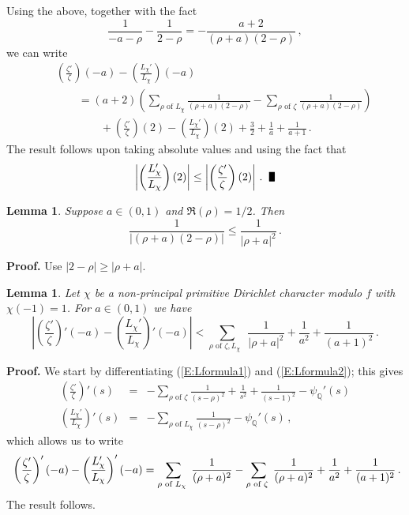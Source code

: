 \documentclass{amsart}
\newtheorem{lemma}[theorem]{Lemma}
\numberwithin{equation}{section}
\numberwithin{table}{section}
\begin{document}
Using the above, together with the fact
$$
 \frac{1}{-a-\rho}-\frac{1}{2-\rho}
 =
 -
 \frac{a+2}{(\rho+a)(2-\rho)}
 \,,
$$
we can write
\begin{eqnarray*}
  &&
  \left(\frac{\zeta'}{\zeta}\right)(-a)
  -
  \left(\frac{L_{\chi}'}{L_{\chi}}\right)(-a)
  \\[.5ex]
  &&
  \qquad
  =
  (a+2)
  \left(
  \sum_{\rho\text{ of $L_\chi$}}
   \frac{1}{(\rho+a)(2-\rho)}
  -
  \sum_{\rho\text{ of $\zeta$}}
   \frac{1}{(\rho+a)(2-\rho)}
   \right)
  \\[.5ex]
  &&
  \qquad
  \qquad
  +
  \left(\frac{\zeta'}{\zeta}\right)(2)
  -
  \left(\frac{L_\chi'}{L_\chi}\right)(2)
    +
  \frac{3}{2}+\frac{1}{a}+\frac{1}{a+1}
  \,.
\end{eqnarray*}
The result follows upon taking absolute values and using the fact that
$$
  \left|
  \left(
  \frac{L'_\chi}{L_\chi}  
  \right)
  (2)
  \right|
  \leq
    \left|
  \left(
  \frac{\zeta'}{\zeta}  
  \right)
  (2)
  \right|
  \,.
  \;\;
  \text{\raisebox{-.25ex}{\scalebox{.786}[1.272]{$\blacksquare$}}}
$$

\begin{lemma}\label{L:q2lemma3}
Suppose $a\in(0,1)$ and $\Re(\rho)=1/2$.
Then
$$
  \frac{1}{|(\rho+a)(2-\rho)|}
  \leq
  \frac{1}{|\rho+a|^2}
  \,.
$$
\end{lemma}

\noindent\textbf{Proof.}
Use $|2-\rho|\geq|\rho+a|$.
{\raisebox{-.25ex}{\scalebox{.786}[1.272]{$\blacksquare$}}}

\begin{lemma}\label{L:q2lemma4}
Let $\chi$ be a non-principal primitive Dirichlet character modulo $f$ with \mbox{$\chi(-1)=1$}.
For $a\in(0,1)$ we have
$$
 \left|
  \left(\frac{\zeta'}{\zeta}\right)'(-a)
  -
 \left(
 \frac{L_{\chi}'}{L_{\chi}}
 \right)'
 (-a)
 \right|
 <
 
 \sum_{\rho\text{ of $\zeta,L_\chi$ }}
 \frac{1}{|\rho+a|^2}
 +
 \frac{1}{a^2}
 +
 \frac{1}{(a+1)^2}
 \,.
$$
\end{lemma}

\noindent\textbf{Proof.}
We start by differentiating (\ref{E:Lformula1}) and (\ref{E:Lformula2}); this gives
\begin{eqnarray}
  \label{E:L1formula1}
  \left(\frac{\zeta'}{\zeta}\right)'(s)
  &=&
  -\sum_{\rho\text{ of $\zeta$}}
  \frac{1}{(s-\rho)^2}
  +
  \frac{1}{s^2}
  +
  \frac{1}{(s-1)^2}
  -
  \psi_{\mathbb{Q}}'(s)
  \\
  \label{E:L1formula2}
  \left(\frac{L_\chi'}{L_\chi}\right)'(s)
  &=&
  -\sum_{\rho\text{ of $L_\chi$}}
  \frac{1}{(s-\rho)^2}
  -
  \psi_{\mathbb{Q}}'(s)
  \,,
\end{eqnarray}
which allows us to write
\begin{eqnarray*}
  &&
  \hspace{-1.5ex}
  \left(\frac{\zeta'}{\zeta}\right)'(-a)
  -
 \left(
 \frac{L_{\chi}'}{L_{\chi}}
 \right)'
 (-a)
 =
 \sum_{\rho\text{ of $L_\chi$ }}
 \frac{1}{(\rho+a)^2}
 -
 \sum_{\rho\text{ of $\zeta$ }}
 \frac{1}{(\rho+a)^2}
 +
 \frac{1}{a^2}
 +
 \frac{1}{(a+1)^2}
 \,.
\end{eqnarray*}
The result follows.
{\raisebox{-.25ex}{\scalebox{.786}[1.272]{$\blacksquare$}}}
\end{document}
